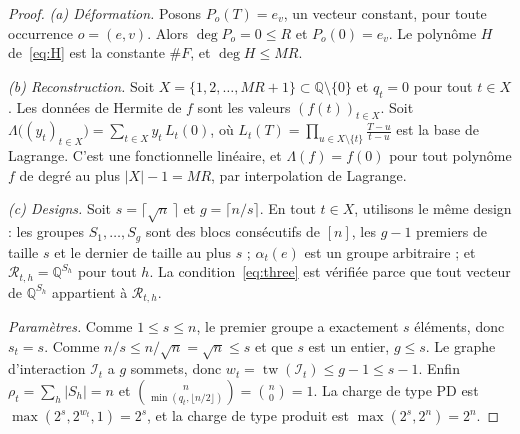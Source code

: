 \documentclass[11pt,a4paper]{article}
\theoremstyle{definition}
\theoremstyle{remark}
\newcommand{\Q}{\mathbb{Q}}
\newcommand{\cR}{\mathcal{R}}
\newcommand{\cI}{\mathcal{I}}
\newcommand{\tw}{\operatorname{tw}}
\begin{document}
\begin{proof}
\emph{(a) Déformation.} Posons $P_o(T)=e_v$, un vecteur constant, pour toute occurrence
$o=(e,v)$. Alors $\deg P_o=0\le R$ et $P_o(0)=e_v$. Le polynôme $H$ de~\eqref{eq:H} est la
constante $\#F$, et $\deg H\le MR$.

\emph{(b) Reconstruction.} Soit $X=\{1,2,\dots,MR+1\}\subset\Q\setminus\{0\}$ et $q_t=0$
pour tout $t\in X$. Les données de Hermite de $f$ sont les valeurs $(f(t))_{t\in X}$. Soit
$\Lambda\bigl((y_t)_{t\in X}\bigr)=\sum_{t\in X}y_t\,L_t(0)$, où
$L_t(T)=\prod_{u\in X\setminus\{t\}}\frac{T-u}{t-u}$ est la base de Lagrange. C'est une
fonctionnelle linéaire, et $\Lambda(f)=f(0)$ pour tout polynôme $f$ de degré au plus
$|X|-1=MR$, par interpolation de Lagrange.

\emph{(c) Designs.} Soit $s=\lceil\sqrt n\,\rceil$ et $g=\lceil n/s\rceil$. En tout $t\in X$,
utilisons le même design : les groupes $S_1,\dots,S_g$ sont des blocs consécutifs de $[n]$,
les $g-1$ premiers de taille $s$ et le dernier de taille au plus $s$ ; $\alpha_t(e)$ est un
groupe arbitraire ; et $\cR_{t,h}=\Q^{S_h}$ pour tout $h$. La condition~\eqref{eq:three} est
vérifiée parce que tout vecteur de $\Q^{S_h}$ appartient à $\cR_{t,h}$.

\emph{Paramètres.} Comme $1\le s\le n$, le premier groupe a exactement $s$ éléments, donc
$s_t=s$. Comme $n/s\le n/\sqrt n=\sqrt n\le s$ et que $s$ est un entier, $g\le s$. Le graphe
d'interaction $\cI_t$ a $g$ sommets, donc $w_t=\tw(\cI_t)\le g-1\le s-1$. Enfin
$\rho_t=\sum_h|S_h|=n$ et $\binom{n}{\min(q_t,\lfloor n/2\rfloor)}=\binom n0=1$. La charge de
type PD est $\max(2^{s},2^{w_t},1)=2^{s}$, et la charge de type produit est
$\max(2^s,2^{n})=2^n$.
\end{proof}
\end{document}
